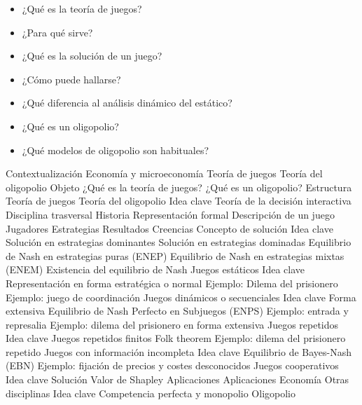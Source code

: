 \documentclass{nuevotema}
\begin{document}

\begin{itemize}
	\item ¿Qué es la teoría de juegos?
	\item ¿Para qué sirve?
	\item ¿Qué es la solución de un juego?
	\item ¿Cómo puede hallarse?
	\item ¿Qué diferencia al análisis dinámico del estático?
	\item ¿Qué es un oligopolio?
	\item ¿Qué modelos de oligopolio son habituales?
\end{itemize}

\esquemacorto

\begin{esquema}[enumerate]
	\1[] 
		\2 Contextualización
			\3 Economía y microeconomía
			\3 Teoría de juegos
			\3 Teoría del oligopolio
		\2 Objeto
			\3 ¿Qué es la teoría de juegos?
			\3 ¿Qué es un oligopolio?
		\2 Estructura
			\3 Teoría de juegos
			\3 Teoría del oligopolio
	\1 
		\2 Idea clave
			\3 Teoría de la decisión interactiva
			\3 Disciplina trasversal
			\3 Historia
			\3 Representación formal
		\2 Descripción de un juego
			\3 Jugadores
			\3 Estrategias
			\3 Resultados
			\3 Creencias
		\2 Concepto de solución
			\3 Idea clave
			\3 Solución en estrategias dominantes
			\3 Solución en estrategias dominadas
			\3 Equilibrio de Nash en estrategias puras (ENEP)
			\3 Equilibrio de Nash en estrategias mixtas (ENEM)
			\3 Existencia del equilibrio de Nash
		\2 Juegos estáticos
			\3 Idea clave
			\3 Representación en forma estratégica o normal
			\3 Ejemplo: Dilema del prisionero
			\3 Ejemplo: juego de coordinación
		\2 Juegos dinámicos o secuenciales
			\3 Idea clave
			\3 Forma extensiva
			\3 Equilibrio de Nash Perfecto en Subjuegos (ENPS)
			\3 Ejemplo: entrada y represalia
			\3 Ejemplo: dilema del prisionero en forma extensiva
		\2 Juegos repetidos
			\3 Idea clave
			\3 Juegos repetidos finitos
			\3 Folk theorem
			\3 Ejemplo: dilema del prisionero repetido
		\2 Juegos con información incompleta
			\3 Idea clave
			\3 Equilibrio de Bayes-Nash (EBN)
			\3 Ejemplo: fijación de precios y costes desconocidos
		\2 Juegos cooperativos
			\3 Idea clave
			\3 Solución
			\3 Valor de Shapley
			\3 Aplicaciones
		\2 Aplicaciones
			\3 Economía
			\3 Otras disciplinas
	\1 
		\2 Idea clave
			\3 Competencia perfecta y monopolio
			\3 Oligopolio

\end{esquema}
\end{document}

